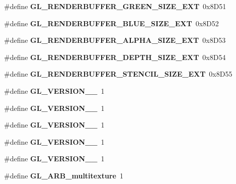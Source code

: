 \begin{DoxyCompactItemize}
\item 
\#define {\bfseries G\+L\+\_\+\+R\+E\+N\+D\+E\+R\+B\+U\+F\+F\+E\+R\+\_\+\+G\+R\+E\+E\+N\+\_\+\+S\+I\+Z\+E\+\_\+\+E\+X\+T}~0x8\+D51\label{_s_d_l__opengl_8h_a17aa1b50023303d3bc294cf0ad1d3163}

\item 
\#define {\bfseries G\+L\+\_\+\+R\+E\+N\+D\+E\+R\+B\+U\+F\+F\+E\+R\+\_\+\+B\+L\+U\+E\+\_\+\+S\+I\+Z\+E\+\_\+\+E\+X\+T}~0x8\+D52\label{_s_d_l__opengl_8h_a7746d021dd93f9bff471a4ae0b86f355}

\item 
\#define {\bfseries G\+L\+\_\+\+R\+E\+N\+D\+E\+R\+B\+U\+F\+F\+E\+R\+\_\+\+A\+L\+P\+H\+A\+\_\+\+S\+I\+Z\+E\+\_\+\+E\+X\+T}~0x8\+D53\label{_s_d_l__opengl_8h_aafa214ca3a39e56903514093665f3946}

\item 
\#define {\bfseries G\+L\+\_\+\+R\+E\+N\+D\+E\+R\+B\+U\+F\+F\+E\+R\+\_\+\+D\+E\+P\+T\+H\+\_\+\+S\+I\+Z\+E\+\_\+\+E\+X\+T}~0x8\+D54\label{_s_d_l__opengl_8h_a55b83b8a69bfa7db2f66658bc0e5ae4e}

\item 
\#define {\bfseries G\+L\+\_\+\+R\+E\+N\+D\+E\+R\+B\+U\+F\+F\+E\+R\+\_\+\+S\+T\+E\+N\+C\+I\+L\+\_\+\+S\+I\+Z\+E\+\_\+\+E\+X\+T}~0x8\+D55\label{_s_d_l__opengl_8h_a496995d1217f9491f9125166d68a80f4}

\item 
\#define {\bfseries G\+L\+\_\+\+V\+E\+R\+S\+I\+O\+N\+\_\+\_}~1\label{_s_d_l__opengl_8h_a4f43b15014e1e7ab03c4ff00067c94ba}

\item 
\#define {\bfseries G\+L\+\_\+\+V\+E\+R\+S\+I\+O\+N\+\_\+\_}~1\label{_s_d_l__opengl_8h_a16a1d101bdb857b6438c8e259a67c7fe}

\item 
\#define {\bfseries G\+L\+\_\+\+V\+E\+R\+S\+I\+O\+N\+\_\+\_}~1\label{_s_d_l__opengl_8h_a22808f8ab51eb65eb5d87604cb430b08}

\item 
\#define {\bfseries G\+L\+\_\+\+V\+E\+R\+S\+I\+O\+N\+\_\+\_}~1\label{_s_d_l__opengl_8h_ae44e2c0f6bb48b28f2b2a8c35431f591}

\item 
\#define {\bfseries G\+L\+\_\+\+V\+E\+R\+S\+I\+O\+N\+\_\+\_}~1\label{_s_d_l__opengl_8h_a54343182c95193ba220e4f5c009d4811}

\item 
\#define {\bfseries G\+L\+\_\+\+A\+R\+B\+\_\+multitexture}~1\label{_s_d_l__opengl_8h_a11215f80571897a4dd62d1f9692d05fe}


\end{DoxyCompactItemize}
